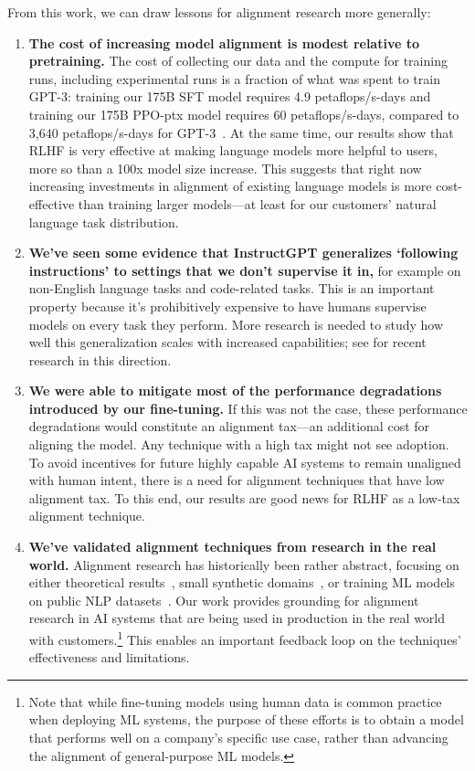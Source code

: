 \documentclass{article}
\begin{document}
From this work, we can draw lessons for alignment research more generally:

\begin{enumerate}
\item \textbf{The cost of increasing model alignment is modest relative to pretraining.} The cost of collecting our data and the compute for training runs, including experimental runs is a fraction of what was spent to train GPT-3: training our 175B SFT model requires 4.9 petaflops/s-days and training our 175B PPO-ptx model requires 60 petaflops/s-days, compared to 3,640 petaflops/s-days for GPT-3~\citep{brown2020language}. At the same time, our results show that RLHF is very effective at making language models more helpful to users, more so than a 100x model size increase. This suggests that right now increasing investments in alignment of existing language models is more cost-effective than training larger models---at least for our customers' natural language task distribution.
\item \textbf{We've seen some evidence that InstructGPT generalizes `following instructions' to settings that we don't supervise it in,} for example on non-English language tasks and code-related tasks. This is an important property because it's prohibitively expensive to have humans supervise models on every task they perform. More research is needed to study how well this generalization scales with increased capabilities; see \citet{christiano2021eliciting} for recent research in this direction. 
\item \textbf{We were able to mitigate most of the performance degradations introduced by our fine-tuning.} If this was not the case, these performance degradations would constitute an alignment tax---an additional cost for aligning the model. Any technique with a high tax might not see adoption. To avoid incentives for future highly capable AI systems to remain unaligned with human intent, there is a need for alignment techniques that have low alignment tax. To this end, our results are good news for RLHF as a low-tax alignment technique.
\item \textbf{We've validated alignment techniques from research in the real world.} Alignment research has historically been rather abstract, focusing on either theoretical results~\citep{soares2015corrigibility}, small synthetic domains~\citep{christiano2018supervising,leike2017ai}, or training ML models on public NLP datasets~\citep{ziegler2019fine,stiennon2020learning}. Our work provides grounding for alignment research in AI systems that are being used in production in the real world with customers.\footnote{Note that while fine-tuning models using human data is common practice when deploying ML systems, the purpose of these efforts is to obtain a model that performs well on a company's specific use case, rather than advancing the alignment of general-purpose ML models. } This enables an important feedback loop on the techniques' effectiveness and limitations.
\end{enumerate}
\end{document}
